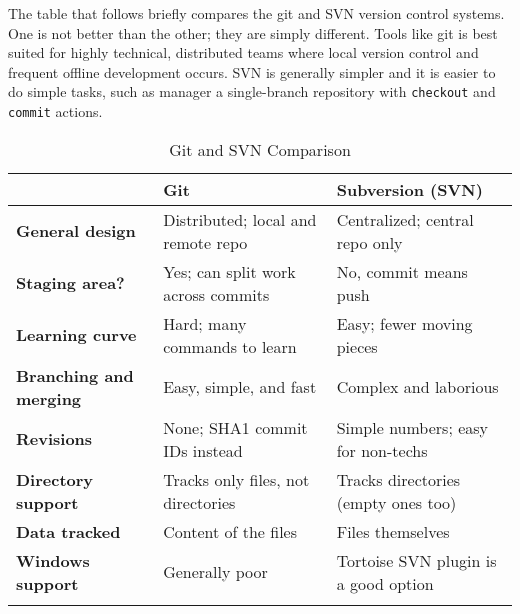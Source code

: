 The table that follows briefly compares the git and SVN version control
systems. One is not better than the other; they are simply different. Tools
like git is best suited for highly technical, distributed teams where local
version control and frequent offline development occurs. SVN is generally
simpler and it is easier to do simple tasks, such as manager a single-branch
repository with \verb|checkout| and \verb|commit| actions.

\begin{longtable}{lll}
\toprule
&
\textbf{Git}
&
\textbf{Subversion (SVN)}
\\ \midrule
\textbf{General design}
&
Distributed; local and remote repo
&
Centralized; central repo only
\\ \midrule
\textbf{Staging area?}
&
Yes; can split work across commits
&
No, commit means push
\\ \midrule
\textbf{Learning curve}
&
Hard; many commands to learn
&
Easy; fewer moving pieces
\\ \midrule
\textbf{Branching and merging}
&
Easy, simple, and fast
&
Complex and laborious
\\ \midrule
\textbf{Revisions}
&
None; SHA1 commit IDs instead
&
Simple numbers; easy for non-techs
\\ \midrule
\textbf{Directory support}
&
Tracks only files, not directories
&
Tracks directories (empty ones too)
\\ \midrule
\textbf{Data tracked}
&
Content of the files
&
Files themselves
\\ \midrule
\textbf{Windows support}
&
Generally poor
&
Tortoise SVN plugin is a good option
\\
\bottomrule
\caption{Git and SVN Comparison}
\end{longtable}
